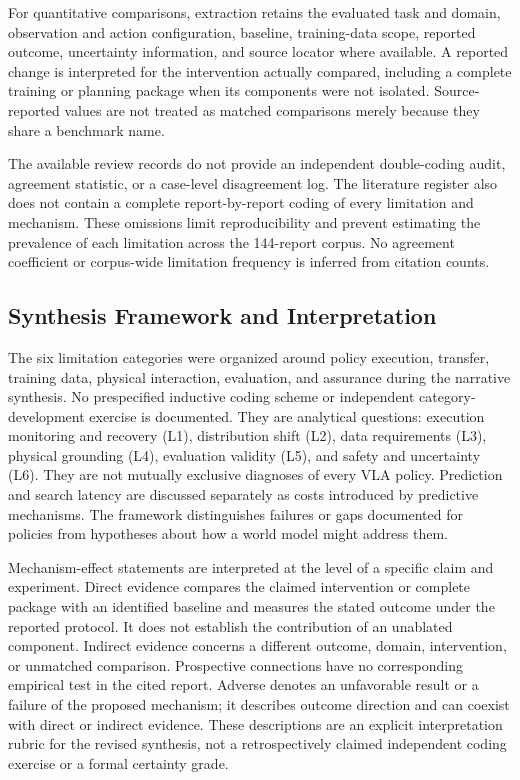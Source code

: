 \documentclass{ieeeaccess}
\begin{document}
\textcolor[RGB]{104,48,148}{For quantitative comparisons, extraction retains the evaluated task and domain, observation and action configuration, baseline, training-data scope, reported outcome, uncertainty information, and source locator where available. A reported change is interpreted for the intervention actually compared, including a complete training or planning package when its components were not isolated. Source-reported values are not treated as matched comparisons merely because they share a benchmark name.}

\textcolor[RGB]{104,48,148}{The available review records do not provide an independent double-coding audit, agreement statistic, or a case-level disagreement log. The literature register also does not contain a complete report-by-report coding of every limitation and mechanism. These omissions limit reproducibility and prevent estimating the prevalence of each limitation across the 144-report corpus. No agreement coefficient or corpus-wide limitation frequency is inferred from citation counts.}

\subsection{Synthesis Framework and Interpretation}
\label{sec:synthesis-rubric}
\textcolor[RGB]{104,48,148}{The six limitation categories were organized around policy execution, transfer, training data, physical interaction, evaluation, and assurance during the narrative synthesis. No prespecified inductive coding scheme or independent category-development exercise is documented. They are analytical questions: execution monitoring and recovery (L1), distribution shift (L2), data requirements (L3), physical grounding (L4), evaluation validity (L5), and safety and uncertainty (L6). They are not mutually exclusive diagnoses of every VLA policy. Prediction and search latency are discussed separately as costs introduced by predictive mechanisms. The framework distinguishes failures or gaps documented for policies from hypotheses about how a world model might address them.}

\textcolor[RGB]{104,48,148}{Mechanism-effect statements are interpreted at the level of a specific claim and experiment. Direct evidence compares the claimed intervention or complete package with an identified baseline and measures the stated outcome under the reported protocol. It does not establish the contribution of an unablated component. Indirect evidence concerns a different outcome, domain, intervention, or unmatched comparison. Prospective connections have no corresponding empirical test in the cited report. Adverse denotes an unfavorable result or a failure of the proposed mechanism; it describes outcome direction and can coexist with direct or indirect evidence. These descriptions are an explicit interpretation rubric for the revised synthesis, not a retrospectively claimed independent coding exercise or a formal certainty grade.}
\end{document}
